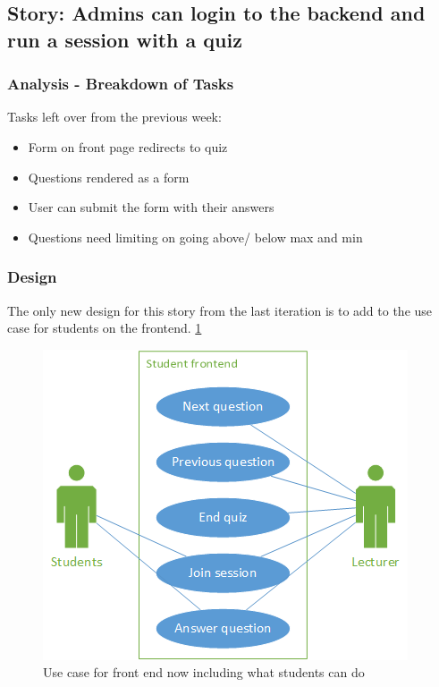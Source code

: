 \subsection{Story: Admins can login to the backend and run a session with a quiz}
\subsubsection{Analysis - Breakdown of Tasks}
Tasks left over from the previous week:
\begin{itemize}
	\item Form on front page redirects to quiz
	\item Questions rendered as a form
	\item User can submit the form with their answers
	\item Questions need limiting on going above/ below max and min
\end{itemize}
\subsubsection{Design}
The only new design for this story from the last iteration is to add to the use case for students on the frontend. \ref{fig:iter-5-frontend-use-case}

\begin{figure}
	\caption{Use case for front end now including what students can do}
	\centerline{\includegraphics{Chapter2/Iter-5/iter-5-frontend-use-case}}
	\label{fig:iter-5-frontend-use-case}
\end{figure}

